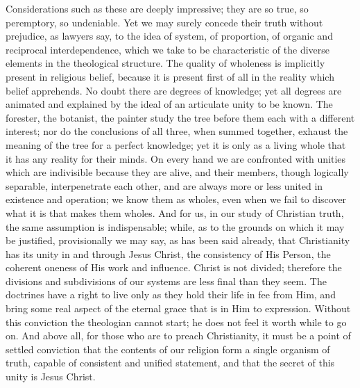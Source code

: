 \documentclass[12pt,a5paper]{article}
\begin{document}
Considerations such as these are deeply impressive; they
are so true, so peremptory, so undeniable. Yet we may
surely concede their truth without prejudice, as lawyers
say, to the idea of system, of proportion, of organic and
reciprocal interdependence, which we take to be characteristic
of the diverse elements in the theological structure. The
quality of wholeness is implicitly present in religious belief,
because it is present first of all in the reality which belief
apprehends. No doubt there are degrees of knowledge;
yet all degrees are animated and explained by the ideal of
an articulate unity to be known. The forester, the botanist,
the painter study the tree before them each with a different
interest; nor do the conclusions of all three, when summed
together, exhaust the meaning of the tree for a perfect knowledge;
yet it is only as a living whole that it has any reality
for their minds. On every hand we are confronted with
unities which are indivisible because they are alive, and their
members, though logically separable, interpenetrate each
other, and are always more or less united in existence and
operation; we know them as wholes, even when we fail to
discover what it is that makes them wholes. And for us,
in our study of Christian truth, the same assumption is
indispensable; while, as to the grounds on which it may be
justified, provisionally we may say, as has been said already,
that Christianity has its unity in and through Jesus Christ,
the consistency of His Person, the coherent oneness of His
work and influence. Christ is not divided; therefore the
divisions and subdivisions of our systems are less final
than they seem. The doctrines have a right to live only as
they hold their life in fee from Him, and bring some real
aspect of the eternal grace that is in Him to expression.
Without this conviction the theologian cannot start; he does
not feel it worth while to go on. And above all, for those
who are to preach Christianity, it must be a point of settled
conviction that the contents of our religion form a single
organism of truth, capable of consistent and unified statement,
and that the secret of this unity is Jesus Christ.
\end{document}
